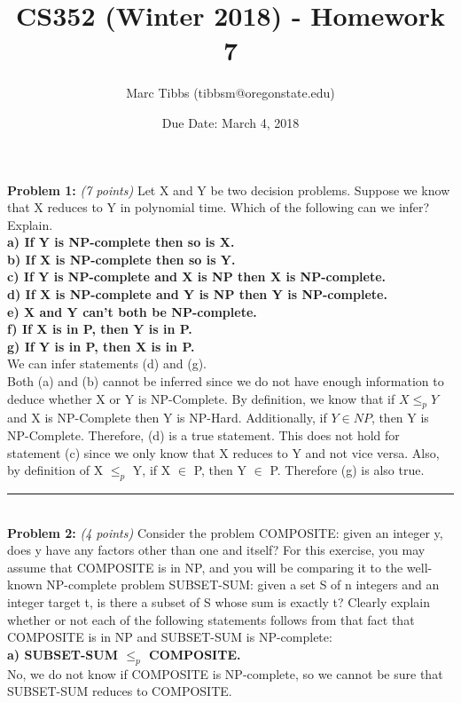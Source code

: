 \documentclass{article}
\title{CS352 (Winter 2018) - Homework 7}
\author{Marc Tibbs (tibbsm@oregonstate.edu)}
\date{Due Date: March 4, 2018}
\begin{document}
\maketitle

\noindent \textbf{Problem 1:} \textit{(7 points)} Let X and Y be two decision problems. Suppose we know that X reduces to Y in polynomial time. Which of the following can we infer? Explain.
\\[.25cm]

\noindent\textbf{a) If Y is NP-complete then so is X.}\\
\textbf{b) If X is NP-complete then so is Y.}\\
\textbf{c) If Y is NP-complete and X is NP then X is NP-complete.}\\
\textbf{d) If X is NP-complete and Y is NP then Y is NP-complete.}\\
\textbf{e) X and Y can't both be NP-complete. }\\
\textbf{f) If X is in P, then Y is in P.}\\
\textbf{g) If Y is in P, then X is in P.}
\\[.25cm]  
We can infer statements (d) and (g). 
\\[.15cm]
Both (a) and (b) cannot be inferred since we do not have enough information to deduce whether X or Y is NP-Complete. By definition, we know that if $X \leq _p Y$ and X is NP-Complete then Y is NP-Hard. Additionally, if $Y \in NP$, then Y is NP-Complete. Therefore, (d) is a true statement. This does not hold for statement (c) since we only know that X reduces to Y and not vice versa. Also, by definition of X $\leq _p$ Y, if X $\in$ P, then Y $\in$ P. Therefore (g) is also true. 
\\[.25cm]

\noindent\rule{8cm}{0.4pt}
\\[.25cm]

\noindent \textbf{Problem 2:} \textit{(4 points)} Consider the problem COMPOSITE: given an integer y, does y have any factors other than one and itself? For this exercise, you may assume that COMPOSITE is in NP, and you will be comparing it to the well-known NP-complete problem SUBSET-SUM: given a set S of n integers and an integer target t, is there a subset of S whose sum is exactly t? Clearly explain whether or not each of the following statements follows from that fact that COMPOSITE is in NP and SUBSET-SUM is NP-complete:
\\[.25cm]

\noindent\textbf{a) SUBSET-SUM $\leq _p$ COMPOSITE.}
\\
No, we do not know if COMPOSITE is NP-complete, so we cannot be sure that SUBSET-SUM reduces to COMPOSITE.
\\[.25cm]
\end{document}
